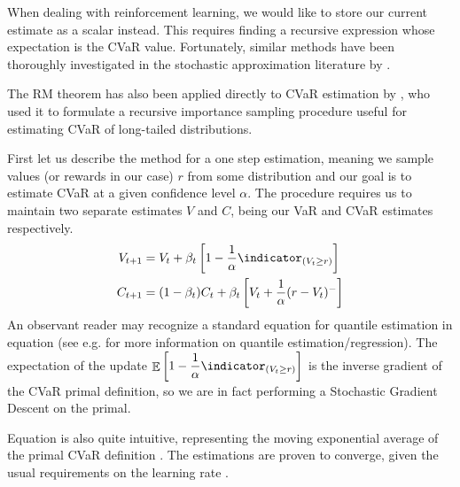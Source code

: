 When dealing with reinforcement learning, we would like to store our current estimate as a scalar instead. This requires finding a recursive expression whose expectation is the CVaR value. Fortunately, similar methods have been thoroughly investigated in the stochastic approximation literature by \citet{robbins1951stochastic}.

The RM theorem has also been applied directly to CVaR estimation by \citet{bardou2009recursive}, who used it to formulate a recursive importance sampling procedure useful for estimating CVaR of long-tailed distributions.

First let us describe the method for a one step estimation, meaning we sample values (or rewards in our case) $r$ from some distribution and our goal is to estimate CVaR at a given confidence level $\alpha$. The procedure requires us to maintain two separate estimates $V$ and $C$, being our VaR and CVaR estimates respectively.
\begin{align}
V_{t+1} &= V_{t} + \beta_t \bsquare{1-\dfrac{1}{\alpha}\indicator_{(V_t \ge r)}}\label{eqn:varestimate}\\
C_{t+1} &= (1-\beta_t)C_t + \beta_t \bsquare{V_t + \dfrac{1}{\alpha}(r-V_t)^-}\label{eqn:cvarestimate}
\end{align}
An observant reader may recognize a standard equation for quantile estimation in equation  (see e.g. \citet{koenker2001quantile} for more information on quantile estimation/regression). The expectation of the update $\expect\bsquare{1-\dfrac{1}{\alpha}\indicator_{(V_t \ge r)}}$ is the inverse gradient of the CVaR primal definition, so we are in fact performing a Stochastic Gradient Descent on the primal.

Equation  is also quite intuitive, representing the moving exponential average of the primal CVaR definition . The estimations are proven to converge, given the usual requirements on the learning rate  \citep{bardou2009recursive}.


